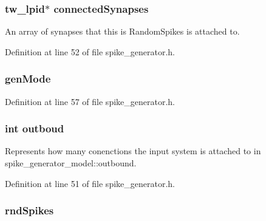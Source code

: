 \subsubsection[{connected\+Synapses}]{\setlength{\rightskip}{0pt plus 5cm}tw\+\_\+lpid$\ast$ connected\+Synapses}\label{structspike_gen_state_a569dc67b8984bb0a3616bf17f9763ebb}


An array of synapses that this is Random\+Spikes is attached to. 



Definition at line 52 of file spike\+\_\+generator.\+h.

\hypertarget{structspike_gen_state_a79f1111d8527d3ef966593c8d389f34d}{}
\subsubsection[{gen\+Mode}]{ gen\+Mode}\label{structspike_gen_state_a79f1111d8527d3ef966593c8d389f34d}


Definition at line 57 of file spike\+\_\+generator.\+h.

\hypertarget{structspike_gen_state_aec7144375204d70824626d74677d71ce}{}
\subsubsection[{outboud}]{\setlength{\rightskip}{0pt plus 5cm}int outboud}\label{structspike_gen_state_aec7144375204d70824626d74677d71ce}


Represents how many conenctions the input system is attached to in spike\+\_\+generator\+\_\+model\+::outbound. 



Definition at line 51 of file spike\+\_\+generator.\+h.

\hypertarget{structspike_gen_state_a57768e1ceaa4dd88752232ad89b4e8b7}{}
\subsubsection[{rnd\+Spikes}]{ rnd\+Spikes}\label{structspike_gen_state_a57768e1ceaa4dd88752232ad89b4e8b7}


